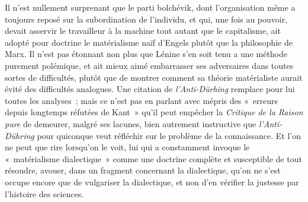 \documentclass[french,twoside]{book} %
\begin{document}
Il n'est nullement surprenant que le parti bolchévik, dont l'organisation même a toujours reposé sur la subordination de l'individu, et qui, une fois au pouvoir, devait asservir le travailleur à la machine tout autant que le capitalisme, ait adopté pour doctrine le matérialisme naïf d'Engels plutôt que la philosophie de Marx. Il n'est pas étonnant non plus que Lénine s'en soit tenu a une méthode purement polémique, et ait mieux aimé embarrasser ses adversaires dans toutes sortes de difficultés, plutôt que de montrer comment sa théorie matérialiste aurait évité des difficultés analogues. Une citation de {\itshape l'Anti-Dürhing} remplace pour lui toutes les analyses ; mais ce n'est pas en parlant avec mépris des « erreurs depuis longtemps réfutées de Kant » qu'il peut empêcher la {\itshape Critique de la Raison pure} de demeurer, malgré ses lacunes, bien autrement instructive que {\itshape l'Anti-Dühring} pour quiconque veut réfléchir sur le problème de la connaissance. Et l'on ne peut que rire lorsqu'on le voit, lui qui a constamment invoque le « matérialisme dialectique » comme une doctrine complète et susceptible de tout résoudre, avouer, dans un fragment concernant la dialectique, qu'on ne s'est occupe encore que de vulgariser la dialectique, et non d'en vérifier la justesse par l'histoire des sciences.\par
\end{document}
